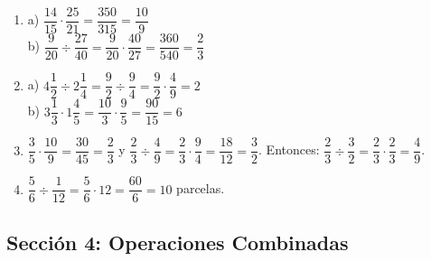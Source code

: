 \documentclass[12pt, letterpaper]{article}
\begin{document}
  \begin{enumerate}[leftmargin=*, label=\textbf{\arabic*.}]
    \item
          a) $\dfrac{14}{15} \cdot \dfrac{25}{21} = \dfrac{350}{315} = \dfrac{10}{9}$ \\[2pt]
          b) $\dfrac{9}{20} \div \dfrac{27}{40} = \dfrac{9}{20} \cdot \dfrac{40}{27} = \dfrac{360}{540} = \dfrac{2}{3}$

    \item
          a) $4\dfrac{1}{2} \div 2\dfrac{1}{4} = \dfrac{9}{2} \div \dfrac{9}{4} = \dfrac{9}{2} \cdot \dfrac{4}{9} = 2$ \\[2pt]
          b) $3\dfrac{1}{3} \cdot 1\dfrac{4}{5} = \dfrac{10}{3} \cdot \dfrac{9}{5} = \dfrac{90}{15} = 6$

    \item $\dfrac{3}{5} \cdot \dfrac{10}{9} = \dfrac{30}{45} = \dfrac{2}{3}$ \quad y \quad $\dfrac{2}{3} \div \dfrac{4}{9} = \dfrac{2}{3} \cdot \dfrac{9}{4} = \dfrac{18}{12} = \dfrac{3}{2}$.
          Entonces: $\dfrac{2}{3} \div \dfrac{3}{2} = \dfrac{2}{3} \cdot \dfrac{2}{3} = \dfrac{4}{9}$.

    \item $\dfrac{5}{6} \div \dfrac{1}{12} = \dfrac{5}{6} \cdot 12 = \dfrac{60}{6} = 10$ parcelas.
  \end{enumerate}

  \newpage

  \subsection*{Sección 4: Operaciones Combinadas}
\end{document}
